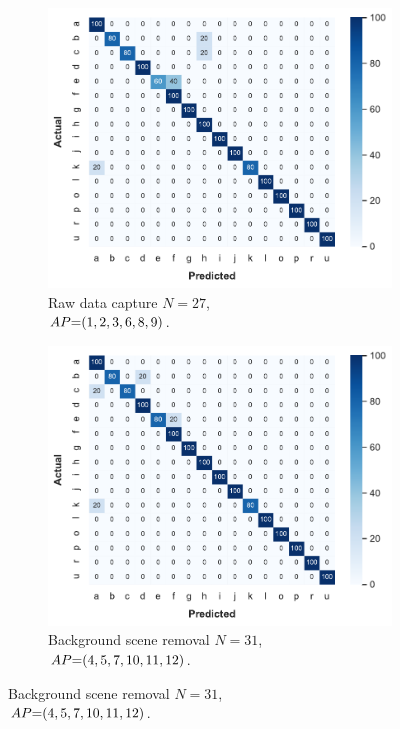 \begin{figure}[!tb]
    \begin{subfigure}{.49\textwidth}
        \centering
        \includegraphics[width=.99\linewidth]{Figures/RadarExperiments/Datasets/SensorsComparison/Walabot/confusion-raw.pdf}
        \vspace{-18pt}
        \captionsetup{width=.95\linewidth}
        \caption{Raw data capture $N{=}27$, \\ $\splitatcommas{AP{=}(1, 2, 3, 6, 8, 9)}$.}
        \label{fig:radar-experiments:sensors:walabot-confusion:raw}
    \end{subfigure}
    \begin{subfigure}{.49\textwidth}
        \centering
        \includegraphics[width=.99\linewidth]{Figures/RadarExperiments/Datasets/SensorsComparison/Walabot/confusion-bgsub.pdf}  
        \vspace{-18pt}
        \captionsetup{width=.95\linewidth}
        \caption{Background scene removal $N{=}31$, \\ $\splitatcommas{AP{=}(4, 5, 7, 10, 11, 12)}$.}
        \label{fig:radar-experiments:sensors:walabot-confusion:bgsub}
    \end{subfigure}
    

\end{figure}
